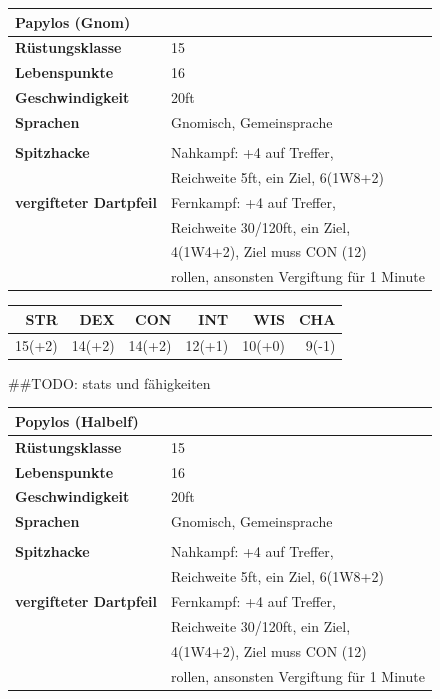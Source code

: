 \documentclass[11pt, twoside]{article}
\begin{document}
\begin{center}
\begin{tabular}{ll}
\textbf{Papylos (Gnom)} & \label{table:papylos}\\[0pt]
\hline
\textbf{Rüstungsklasse} & 15\\[0pt]
\textbf{Lebenspunkte} & 16\\[0pt]
\textbf{Geschwindigkeit} & 20ft\\[0pt]
\textbf{Sprachen} & Gnomisch, Gemeinsprache\\[0pt]
 & \\[0pt]
\textbf{Spitzhacke} & Nahkampf: +4 auf Treffer,\\[0pt]
 & Reichweite 5ft, ein Ziel, 6(1W8+2)\\[0pt]
\textbf{vergifteter Dartpfeil} & Fernkampf: +4 auf Treffer,\\[0pt]
 & Reichweite 30/120ft, ein Ziel,\\[0pt]
 & 4(1W4+2), Ziel muss CON (12)\\[0pt]
 & rollen, ansonsten Vergiftung für 1 Minute\\[0pt]
\end{tabular}
\end{center}

\begin{center}
\begin{tabular}{rrrrrr}
\textbf{STR} & \textbf{DEX} & \textbf{CON} & \textbf{INT} & \textbf{WIS} & \textbf{CHA}\\[0pt]
\hline
15(+2) & 14(+2) & 14(+2) & 12(+1) & 10(+0) & 9(-1)\\[0pt]
\end{tabular}
\end{center}


\#\#TODO: stats und fähigkeiten
\begin{center}
\begin{tabular}{ll}
\textbf{Popylos (Halbelf)} & \label{table:popylos}\\[0pt]
\hline
\textbf{Rüstungsklasse} & 15\\[0pt]
\textbf{Lebenspunkte} & 16\\[0pt]
\textbf{Geschwindigkeit} & 20ft\\[0pt]
\textbf{Sprachen} & Gnomisch, Gemeinsprache\\[0pt]
 & \\[0pt]
\textbf{Spitzhacke} & Nahkampf: +4 auf Treffer,\\[0pt]
 & Reichweite 5ft, ein Ziel, 6(1W8+2)\\[0pt]
\textbf{vergifteter Dartpfeil} & Fernkampf: +4 auf Treffer,\\[0pt]
 & Reichweite 30/120ft, ein Ziel,\\[0pt]
 & 4(1W4+2), Ziel muss CON (12)\\[0pt]
 & rollen, ansonsten Vergiftung für 1 Minute\\[0pt]
\end{tabular}
\end{center}
\end{document}
